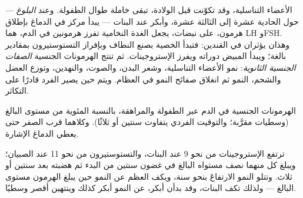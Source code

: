 \begin{proposition}[البلوغ]\label{prop:g11:becoming-male-female:puberty}
الأعضاء التناسلية، وقد تكوّنت قبل الولادة، تبقى خاملة طوال الطفولة.
وعند \emph{البلوغ} --- حول الحادية عشرة إلى الثالثة عشرة،
وأبكر عند البنات --- يبدأ مركز في الدماغ بإطلاق هرمون، على نبضات، يجعل
الغدة النخامية تفرز هرمونين في الدم، هما LH وFSH. وهذان يؤثران في
القندين: فتبدأ الخصية بصنع النطاف وبإفراز التستوستيرون بمقادير بالغة؛
ويبدأ المبيض دوراته ويفرز الإستروجينات. ثم تنتج الهرمونات الجنسية
\emph{الصفات الجنسية الثانوية}: نمو الأعضاء التناسلية، وشعر البدن،
والصوت، والنهدين، وتوزع العضل والشحم،  النمو ثم انغلاق صفائح
النمو في العظام. ويتم  حين يصير الفرد قادرًا على التكاثر.
\end{proposition}
\admitted

\begin{omfigure}

{\small الهرمونات الجنسية في الدم عبر الطفولة والمراهقة، بالنسبة
المئوية من مستوى البالغ (وسطيات مقرَّبة؛ والتوقيت الفردي يتفاوت سنتين
أو ثلاثًا). وكلاهما قرب الصفر حتى يعطي الدماغ الإشارة.}
\end{omfigure}

\begin{example}\label{ex:g11:becoming-male-female:curves}
ترتفع الإستروجينات من نحو 9 عند البنات، والتستوستيرون من نحو 11 عند
الصبيان؛ ويبلغ كل منهما نصف مستواه البالغ في غضون سنتين من البدء ثم
هضبته بعد سنتين أو ثلاث. وتتلو  النمو الارتفاعَ بنحو سنة، ويكف
العظم عن النمو حين يبلغ الهرمون مستوى البالغ --- ولذلك تكف البنات، وقد
بدأن أبكر، عن النمو أبكر كذلك وينتهين أقصر وسطيًا.
\end{example}

